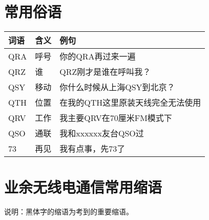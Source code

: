 \newpage

\section{常用俗语}

\begin{longtable}{|l|l|l|}
  \hline
  \textbf{词语} & \textbf{含义} & \textbf{例句}        \\
  \hline
  QRA         & 呼号          & 你的QRA再过来一遍         \\
  \hline
  QRZ         & 谁           & QRZ刚才是谁在呼叫我？       \\
  \hline
  QSY         & 移动          & 你什么时候从上海QSY到北京？    \\
  \hline
  QTH         & 位置          & 在我的QTH这里原装天线完全无法使用 \\
  \hline
  QRV         & 工作          & 我主要QRV在70厘米FM模式下   \\
  \hline
  QSO         & 通联          & 我和xxxxxx友台QSO过     \\
  \hline
  73          & 再见          & 我有点事，先73了          \\
  \hline
\end{longtable}

\newpage

\section{业余无线电通信常用缩语}

说明：黑体字的缩语为考到的重要缩语。

